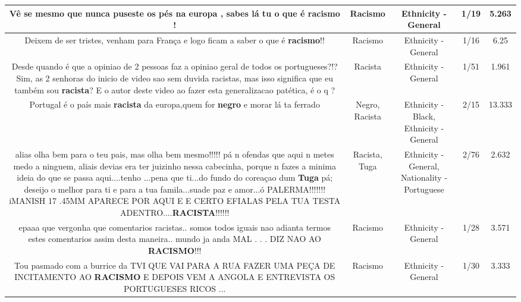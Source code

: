 \documentclass[11pt]{article}
\newlength\mylength
\begin{document}
\begin{center}
\begin{longtable}{|C{.65\mylength}|C{.30\mylength}|C{.12\mylength}|C{.12\mylength}|C{.12\mylength}|}
  \small Vê se mesmo que nunca puseste os pés na europa , sabes lá tu o que é \textbf{racismo} !\normalsize   & Racismo & Ethnicity - General & 1/19 & 5.263 \\  \hline
  \small Deixem de ser tristes, venham para França e logo ficam a saber o que é \textbf{racismo}!!\normalsize   & Racismo & Ethnicity - General & 1/16 & 6.25 \\  \hline
  \small Desde quando é que a opiniao de 2 pessoas faz a opiniao geral de todos os portugueses?!? Sim, as 2 senhoras do inicio de video sao sem duvida racistas, mas isso significa que eu também sou \textbf{racista}? E o autor deste video ao fazer esta generalizacao patética, é o q ?\normalsize   & Racista & Ethnicity - General & 1/51 & 1.961 \\  \hline
  \small Portugal é o país mais \textbf{racista} da europa,quem for \textbf{negro} e morar lá ta ferrado\normalsize   & Negro, Racista & Ethnicity - Black, Ethnicity - General & 2/15 & 13.333 \\  \hline
  \small alias olha bem para o teu pais, mas olha bem mesmo!!!!! pá n ofendas que aqui n metes medo a ninguem, aliais devias era ter juizinho nessa cabecinha, porque n fazes a minima ideia do que se passa aqui....tenho ...pena que ti...do fundo do coreaçao dum \textbf{Tuga} pá; deseijo o melhor para ti e para a tua famila...suade paz e amor...ó PALERMA!!!!!!! iMANISH 17 .45MM APARECE POR AQUI E E CERTO EFIALAS PELA TUA TESTA ADENTRO....\textbf{RACISTA}!!!!!!\normalsize   & Racista, Tuga & Ethnicity - General, Nationality - Portuguese & 2/76 & 2.632 \\  \hline
  \small epaaa que vergonha que comentarios racistas..  somos todos iguais nao adianta termos estes comentarios assim desta maneira.. mundo ja anda MAL . . .  DIZ NAO AO \textbf{RACISMO}!!!\normalsize   & Racismo & Ethnicity - General & 1/28 & 3.571 \\  \hline
  \small Tou pasmado com a burrice da TVI QUE VAI PARA A RUA FAZER UMA PEÇA DE INCITAMENTO AO \textbf{RACISMO} E DEPOIS VEM A ANGOLA E ENTREVISTA OS PORTUGUESES RICOS ...\normalsize   & Racismo & Ethnicity - General & 1/30 & 3.333 \\  \hline

\end{longtable}
\end{center}
\end{document}
